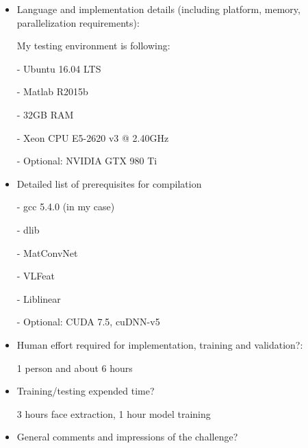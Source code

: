 \documentclass{article}
\begin{document}
\begin{itemize}
\item Language and implementation details (including platform, memory, parallelization requirements): 

My testing environment is following:

- Ubuntu 16.04 LTS

- Matlab R2015b

- 32GB RAM

- Xeon CPU E5-2620 v3 @ 2.40GHz

- Optional: NVIDIA GTX 980 Ti

\item Detailed list of prerequisites for compilation

- gcc 5.4.0 (in my case)

- dlib

- MatConvNet

- VLFeat

- Liblinear

- Optional: CUDA 7.5, cuDNN-v5

\item Human effort required for implementation, training and validation?: 

1 person and about 6 hours

\item Training/testing expended time? 

3 hours face extraction, 1 hour model training

\item General comments and impressions of the challenge?
\end{itemize}
\end{document}
